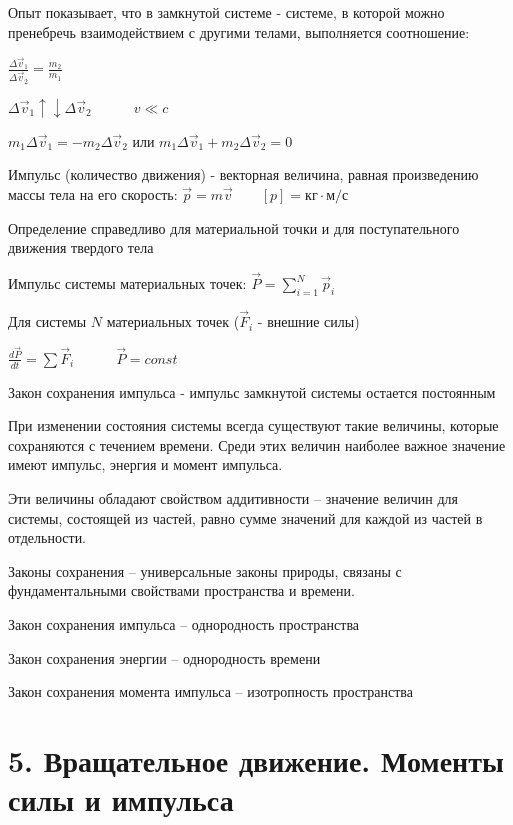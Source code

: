 \documentclass[12pt]{article}
\begin{document}
    Опыт показывает, что в замкнутой системе - системе, в которой можно пренебречь взаимодействием с другими телами,
    выполняется соотношение:

    $\frac{\Delta \vec{v}_1}{\Delta \vec{v}_2} = \frac{m_2}{m_1}$

    $\Delta \vec{v}_1 \uparrow \downarrow \Delta \vec{v}_2 \quad\quad\quad v \ll c$

    $m_1 \Delta \vec{v}_1 = -m_2 \Delta \vec{v}_2$ или $m_1 \Delta \vec{v}_1 + m_2 \Delta \vec{v}_2 = 0$

    Импульс (количество движения) - векторная величина, равная произведению массы тела на его скорость: $\vec{p} = m\vec{v} \quad\quad [p] = \text{кг} \cdot \text{м/с}$

    Определение справедливо для материальной точки и для поступательного движения твердого тела

    Импульс системы материальных точек: $\vec{P} = \sum_{i = 1}^N \vec{p}_i$

    Для системы $N$ материальных точек ($\vec{F}_i$ - внешние силы)

    $\frac{d\vec{P}}{dt} = \sum \vec{F}_i \quad\quad\quad \vec{P} = const$

    Закон сохранения импульса - импульс замкнутой системы остается постоянным


    При изменении состояния системы всегда существуют такие величины, которые сохраняются с течением времени. Среди этих величин наиболее важное значение имеют импульс, энергия и момент импульса.

    Эти величины обладают свойством аддитивности – значение величин для системы, состоящей из частей, равно сумме значений для каждой из частей в отдельности.

    Законы сохранения – универсальные законы природы, связаны с фундаментальными свойствами пространства и времени.

    \begin{center}
        Закон сохранения импульса – однородность пространства

        Закон сохранения энергии – однородность времени

        Закон сохранения момента импульса – изотропность пространства
    \end{center}


    \section{5. Вращательное движение. Моменты силы и импульса}
\end{document}

